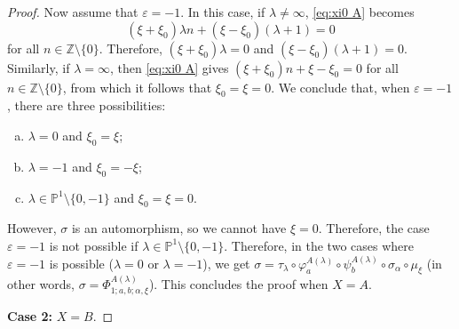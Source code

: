 \documentclass[11pt, svgnames]{amsart}
\newcommand{\ZZ}{\mathbb{Z}}
\newcommand{\PP}{\mathbb{P}}
\newcommand{\nonzero}{\setminus \{0\}}
\newcommand{\case}[2]{\vspace{2mm} \textbf{Case #1:} #2 \vspace{2mm}}
\theoremstyle{definition}
\begin{document}
\begin{proof}
    Now assume that $\varepsilon = -1$. In this case, if $\lambda \neq \infty$, \eqref{eq:xi0 A} becomes
    $$(\xi + \xi_0)\lambda n + (\xi - \xi_0)(\lambda + 1) = 0$$
    for all $n \in \ZZ \nonzero$. Therefore, $(\xi + \xi_0)\lambda = 0$ and $(\xi - \xi_0)(\lambda + 1) = 0$. Similarly, if $\lambda = \infty$, then \eqref{eq:xi0 A} gives $(\xi + \xi_0)n + \xi - \xi_0 = 0$ for all $n \in \ZZ \nonzero$, from which it follows that $\xi_0 = \xi = 0$. We conclude that, when $\varepsilon = -1$, there are three possibilities:
    \begin{enumerate}[(a)]
        \item $\lambda = 0$ and $\xi_0 = \xi$;
        \item $\lambda = -1$ and $\xi_0 = -\xi$;
        \item $\lambda \in \PP^1 \setminus \{0,-1\}$ and $\xi_0 = \xi = 0$.
    \end{enumerate}
    However, $\sigma$ is an automorphism, so we cannot have $\xi = 0$. Therefore, the case $\varepsilon = -1$ is not possible if $\lambda \in \PP^1 \setminus \{0,-1\}$. Therefore, in the two cases where $\varepsilon = -1$ is possible ($\lambda = 0$ or $\lambda = -1$), we get $\sigma = \tau_\lambda \circ \varphi_a^{A(\lambda)} \circ \psi_b^{A(\lambda)} \circ \sigma_\alpha \circ \mu_\xi$ (in other words, $\sigma = \Phi_{1;a,b;\alpha,\xi}^{A(\lambda)}$). This concludes the proof when $X = A$.

    \case{2}{$X = B$.}


\end{proof}
\end{document}
